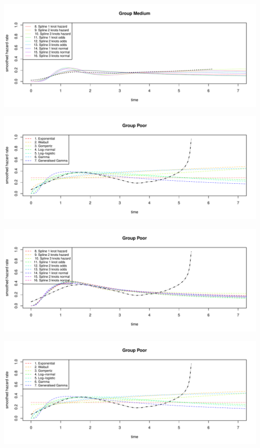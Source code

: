 \documentclass[]{article}
\begin{document}
\begin{flushleft}\includegraphics[height=0.29\textheight]{Images/plot_haz_pred-4} \end{flushleft}

\begin{flushleft}\includegraphics[height=0.29\textheight]{Images/plot_haz_pred-5} \end{flushleft}

\begin{flushleft}\includegraphics[height=0.29\textheight]{Images/plot_haz_pred-6} \end{flushleft}

\begin{flushleft}\includegraphics[height=0.29\textheight]{Images/plot_haz_pred-7} \end{flushleft}
\end{document}

